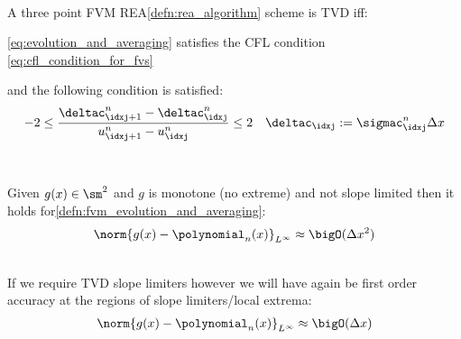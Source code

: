 \begin{lemmabox}\nospacing
    \begin{lemma}\label{lemma:tvd_fvm_rea_scheme}\leavevmode\\
        A three point FVM REA\cref{defn:rea_algorithm} scheme is TVD iff:
        \begin{circlelistnosep}
            \item \cref{eq:evolution_and_averaging} satisfies the CFL condition \cref{eq:cfl_condition_for_fvs}
            \item and the following condition is satisfied:
            \begin{align}
              -2\leq\frac{\deltac_{\idxj+1}^{n}-\deltac_{\idxj}^{n}}{u_{\idxj+1}^{n}-u_{\idxj}^{n}}\leq2&&\deltac_{\idxj}:=\sigmac_{\idxj}^{n}\Delta x
            \end{align}
        \end{circlelistnosep}
    \end{lemma}
\end{lemmabox}
\begin{propositionbox}\nospacing
    \begin{proposition}\leavevmode\\
        \label{proposition:order_of_accuracy}
        \begin{minipage}{0.45\textwidth}
            Given $g(x)\in\sm^{2}$ and $g$ is monotone (no extreme) and not slope limited then it holds for\cref{defn:fvm_evolution_and_averaging}:
            \begin{align}
              \norm{g(x)-\polynomial_{n}(x)}_{L^{\infty}}\approx\bigO(\Delta x^{2})
            \end{align}
        \end{minipage}\hfill
        \begin{minipage}[c]{0.5\textwidth}
           \begin{figure}[H]
            \centering{
              \def\svgwidth{160pt}
              \resizebox{\linewidth}{!}{}
            }
        \end{figure}
        \end{minipage}\\
            If we require TVD slope limiters however we will have again be first order accuracy
            at the regions of slope limiters/local extrema:
            \begin{align}
              \norm{g(x)-\polynomial_{n}(x)}_{L^{\infty}}\approx\bigO(\Delta x)
            \end{align}
    \end{proposition}
\end{propositionbox}

